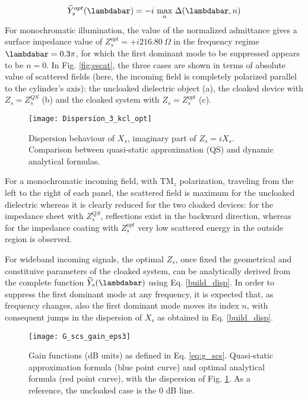 \documentclass[reprint, showpacs, amsmath,amssymb, aps,
prb]{revtex4-1}
\begin{document}
% 
\begin{align}
\widetilde{Y}_s^{opt}(\lambdabar)=-i\ \underset{n}{\mbox{max}} \ \Delta(\lambdabar,n) 
\label{build_disp}
\end{align}
%
For monochromatic illumination, the value of the normalized admittance gives a surface impedance value of  $Z_s^{opt}=+i216.80\ \Omega$ in the frequency regime $\lambdabar=0.3 \pi$, for which the first dominant mode to be suppressed appears to be $n=0$.
%
In Fig. \ref{fig:escat}, the three cases are shown in terms of absolute value of scattered fields (here, the incoming field is completely polarized parallel to the cylinder's axis): the uncloaked dielectric object (a), the cloaked device with $Z_s=Z_s^{QS}$ (b) and the cloaked system with $Z_s=Z_s^{opt}$ (c). 
%
\begin{figure}[ht!]
\centering
\texttt{[image: Dispersion\_3\_kcl\_opt]}
\caption{\small Dispersion behaviour of $X_s$, imaginary part of $Z_s=iX_s$.  Comparison between quasi-static approximation (QS) and dynamic analytical formulas.}
\label{fig:disp}
\end{figure}
%

For a monochromatic incoming field, with TM$_z$ polarization, traveling from the left to the right of each panel, the scattered field is maximum for the uncloaked dielectric whereas it is clearly reduced for the two cloaked devices: for the impedance sheet with $Z_s^{QS}$, reflections exist in the backward direction, whereas for the impedance coating with $Z_s^{opt}$ very low scattered energy in the outside region is observed.

For wideband incoming signals, the optimal $Z_s$, once fixed the geometrical and constituive parameters of the cloaked system, can be analytically derived  from the  complete function $\widetilde{Y}_s(\lambdabar)$ using Eq. \eqref{build_disp}. In order to suppress the first dominant mode at any frequency, it is expected that, as  frequency changes, also the first dominant mode moves its index $n$, with consequent jumps in the dispersion of $X_s$ as obtained in Eq. \eqref{build_disp}. 
%
\begin{figure}[ht!]
\centering
\texttt{[image: G\_scs\_gain\_eps3]}
\caption{\small Gain functions (dB units) as defined in Eq. \eqref{eq:g_scs}. Quasi-static approximation formula (blue point curve) and optimal analytical formula (red point curve), with the dispersion of Fig. \ref{fig:disp}. As a reference, the uncloaked case is the $0$ dB line.}
\label{fig:SCS}
\end{figure}
%
\end{document}
